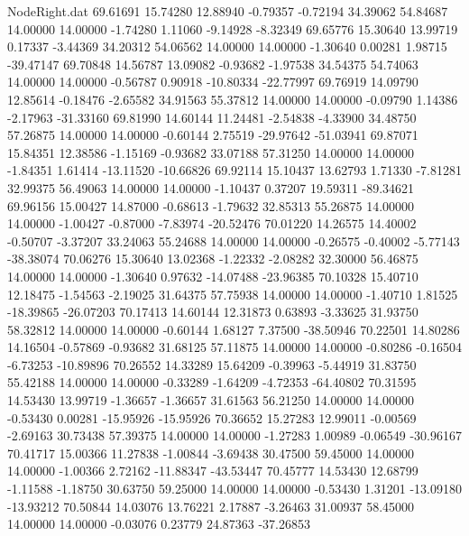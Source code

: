 \begin{filecontents}{NodeRight.dat}
  69.61691   15.74280   12.88940    -0.79357   -0.72194   34.39062   54.84687   14.00000   14.00000   -1.74280    1.11060   -9.14928   -8.32349
  69.65776   15.30640   13.99719     0.17337   -3.44369   34.20312   54.06562   14.00000   14.00000   -1.30640    0.00281    1.98715  -39.47147
  69.70848   14.56787   13.09082    -0.93682   -1.97538   34.54375   54.74063   14.00000   14.00000   -0.56787    0.90918  -10.80334  -22.77997
  69.76919   14.09790   12.85614    -0.18476   -2.65582   34.91563   55.37812   14.00000   14.00000   -0.09790    1.14386   -2.17963  -31.33160
  69.81990   14.60144   11.24481    -2.54838   -4.33900   34.48750   57.26875   14.00000   14.00000   -0.60144    2.75519  -29.97642  -51.03941
  69.87071   15.84351   12.38586    -1.15169   -0.93682   33.07188   57.31250   14.00000   14.00000   -1.84351    1.61414  -13.11520  -10.66826
  69.92114   15.10437   13.62793     1.71330   -7.81281   32.99375   56.49063   14.00000   14.00000   -1.10437    0.37207   19.59311  -89.34621
  69.96156   15.00427   14.87000    -0.68613   -1.79632   32.85313   55.26875   14.00000   14.00000   -1.00427   -0.87000   -7.83974  -20.52476
  70.01220   14.26575   14.40002    -0.50707   -3.37207   33.24063   55.24688   14.00000   14.00000   -0.26575   -0.40002   -5.77143  -38.38074
  70.06276   15.30640   13.02368    -1.22332   -2.08282   32.30000   56.46875   14.00000   14.00000   -1.30640    0.97632  -14.07488  -23.96385
  70.10328   15.40710   12.18475    -1.54563   -2.19025   31.64375   57.75938   14.00000   14.00000   -1.40710    1.81525  -18.39865  -26.07203
  70.17413   14.60144   12.31873     0.63893   -3.33625   31.93750   58.32812   14.00000   14.00000   -0.60144    1.68127    7.37500  -38.50946
  70.22501   14.80286   14.16504    -0.57869   -0.93682   31.68125   57.11875   14.00000   14.00000   -0.80286   -0.16504   -6.73253  -10.89896
  70.26552   14.33289   15.64209    -0.39963   -5.44919   31.83750   55.42188   14.00000   14.00000   -0.33289   -1.64209   -4.72353  -64.40802
  70.31595   14.53430   13.99719    -1.36657   -1.36657   31.61563   56.21250   14.00000   14.00000   -0.53430    0.00281  -15.95926  -15.95926
  70.36652   15.27283   12.99011    -0.00569   -2.69163   30.73438   57.39375   14.00000   14.00000   -1.27283    1.00989   -0.06549  -30.96167
  70.41717   15.00366   11.27838    -1.00844   -3.69438   30.47500   59.45000   14.00000   14.00000   -1.00366    2.72162  -11.88347  -43.53447
  70.45777   14.53430   12.68799    -1.11588   -1.18750   30.63750   59.25000   14.00000   14.00000   -0.53430    1.31201  -13.09180  -13.93212
  70.50844   14.03076   13.76221     2.17887   -3.26463   31.00937   58.45000   14.00000   14.00000   -0.03076    0.23779   24.87363  -37.26853

\end{filecontents}
